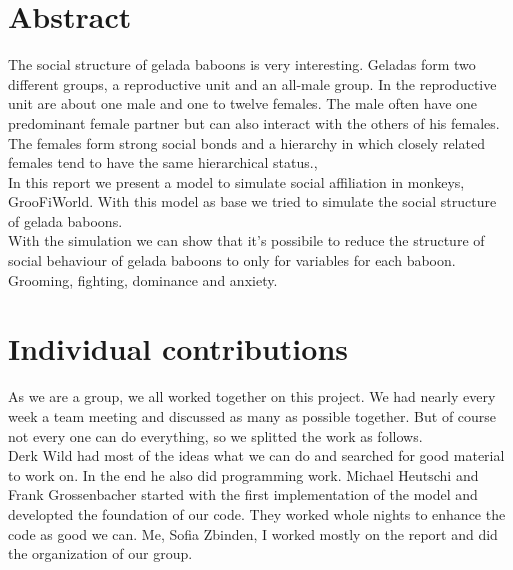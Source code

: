 \documentclass[11pt]{article}
\begin{document}






\tableofcontents
\listoffigures

\newpage



\section{Abstract}
The social structure of gelada baboons is very interesting. Geladas form two different groups, a reproductive unit and an all-male group. In the reproductive unit are about one male and one to twelve females. The male often have one predominant female partner but can also interact with the others of his females. The females form strong social bonds and  a hierarchy in which closely related females tend to have the same hierarchical status.\cite{Dunbar1974},\cite{Dunbar1980}
\\
In this report we present a model to simulate social affiliation in monkeys, GrooFiWorld.\cite{Puga-Gonzalez2009} With this model as base we tried to simulate the social structure of gelada baboons.\\
With the simulation we can show that it's possibile to reduce the structure of social behaviour of gelada baboons to only for variables for each baboon. Grooming, fighting, dominance and anxiety.


\section{Individual contributions}
As we are a group, we all worked together on this project. We had nearly every week a team meeting and discussed as many as possible together. But of course not every one can do everything, so we splitted the work as follows.\\
Derk Wild had most of the ideas what we can do and searched for good material to work on. In the end he also did programming work. Michael Heutschi and Frank Grossenbacher started with the first implementation of the model and developted the foundation of our code. They worked whole nights to enhance the code as good we can. Me, Sofia Zbinden, I worked mostly on the report and did the organization of our group. 
\end{document}
